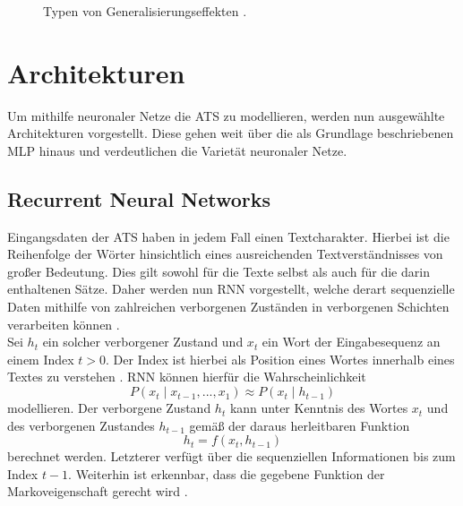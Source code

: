 \begin{figure}[h!]
  \centering
  \caption{Typen von Generalisierungseffekten \cite{EDPOJ}.}
  \label{pic:FittingTypes}
\end{figure}


\section{Architekturen}
\noindent
Um mithilfe neuronaler Netze die \ac{ATS} zu modellieren, werden nun ausgewählte Architekturen vorgestellt. Diese gehen weit über die als Grundlage beschriebenen \ac{MLP} hinaus und verdeutlichen die Varietät neuronaler Netze.


\subsection{Recurrent Neural Networks}
\noindent
Eingangsdaten der \ac{ATS} haben in jedem Fall einen Textcharakter. Hierbei ist die Reihenfolge der Wörter hinsichtlich eines ausreichenden Textverständnisses von großer Bedeutung. Dies gilt sowohl für die Texte selbst als auch für die darin enthaltenen Sätze. Daher werden nun \ac{RNN} vorgestellt, welche derart sequenzielle Daten mithilfe von zahlreichen verborgenen Zuständen in verborgenen Schichten verarbeiten können \cite[S.~301]{ZHA20}.\\

\noindent
Sei $h_t$ ein solcher verborgener Zustand und $x_t$ ein Wort der Eingabesequenz an einem Index $t > 0$. Der Index ist hierbei als Position eines Wortes innerhalb eines Textes zu verstehen \cite{VAS17}. \ac{RNN} können hierfür die Wahrscheinlichkeit $$P(x_t \mid x_{t-1}, ... , x_1) \approx P(x_t \mid h_{t-1})$$ modellieren. Der verborgene Zustand $h_t$ kann unter Kenntnis des Wortes $x_t$ und des verborgenen Zustandes $h_{t-1}$ gemäß der daraus herleitbaren Funktion $$h_t = f(x_t, h_{t-1})$$ berechnet werden. Letzterer verfügt über die sequenziellen Informationen bis zum Index $t-1$. Weiterhin ist erkennbar, dass die gegebene Funktion der Markoveigenschaft gerecht wird \cite[S.~323-324]{ZHA20}.\\

